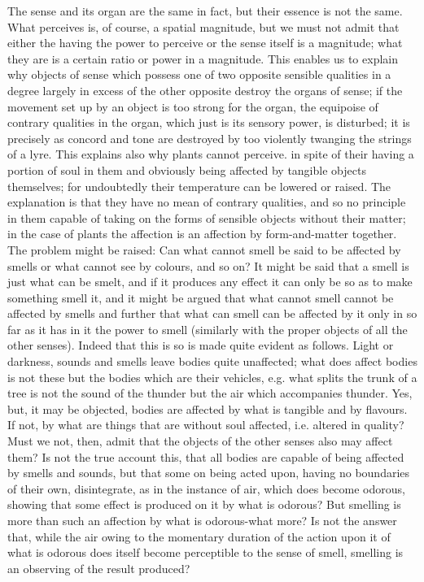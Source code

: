 The sense and its organ are the same in fact, but their essence is
not the same. What perceives is, of course, a spatial magnitude, but
we must not admit that either the having the power to perceive or
the sense itself is a magnitude; what they are is a certain ratio
or power in a magnitude. This enables us to explain why objects of
sense which possess one of two opposite sensible qualities in a degree
largely in excess of the other opposite destroy the organs of sense;
if the movement set up by an object is too strong for the organ, the
equipoise of contrary qualities in the organ, which just is its sensory
power, is disturbed; it is precisely as concord and tone are destroyed
by too violently twanging the strings of a lyre. This explains also
why plants cannot perceive. in spite of their having a portion of
soul in them and obviously being affected by tangible objects themselves;
for undoubtedly their temperature can be lowered or raised. The explanation
is that they have no mean of contrary qualities, and so no principle
in them capable of taking on the forms of sensible objects without
their matter; in the case of plants the affection is an affection
by form-and-matter together. The problem might be raised: Can what
cannot smell be said to be affected by smells or what cannot see by
colours, and so on? It might be said that a smell is just what can
be smelt, and if it produces any effect it can only be so as to make
something smell it, and it might be argued that what cannot smell
cannot be affected by smells and further that what can smell can be
affected by it only in so far as it has in it the power to smell (similarly
with the proper objects of all the other senses). Indeed that this
is so is made quite evident as follows. Light or darkness, sounds
and smells leave bodies quite unaffected; what does affect bodies
is not these but the bodies which are their vehicles, e.g. what splits
the trunk of a tree is not the sound of the thunder but the air which
accompanies thunder. Yes, but, it may be objected, bodies are affected
by what is tangible and by flavours. If not, by what are things that
are without soul affected, i.e. altered in quality? Must we not, then,
admit that the objects of the other senses also may affect them? Is
not the true account this, that all bodies are capable of being affected
by smells and sounds, but that some on being acted upon, having no
boundaries of their own, disintegrate, as in the instance of air,
which does become odorous, showing that some effect is produced on
it by what is odorous? But smelling is more than such an affection
by what is odorous-what more? Is not the answer that, while the air
owing to the momentary duration of the action upon it of what is odorous
does itself become perceptible to the sense of smell, smelling is
an observing of the result produced? 

